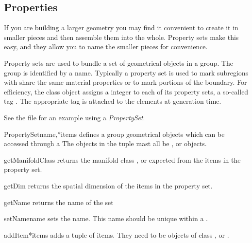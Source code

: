\subsection{Properties}

If you are building a larger geometry you may find it convenient to
create it in smaller pieces and then assemble them into the whole.
Property sets make this easy, and they allow you to name the smaller
pieces for convenience.

Property sets are used to bundle a set of geometrical objects in a
group.  The group is identified by a name.  Typically a property set
is used to mark subregions with share the same material properties or
to mark portions of the boundary.  For efficiency, the \Design class
object assigns a integer to each of its property sets, a so-called tag
.  The appropriate tag is attached to the elements at
generation time.

See the file  for an example using a {\it PropertySet}.


\begin{classdesc}{PropertySet}{name,*items}
defines a group geometrical objects which can be accessed through a 
The objects in the tuple  mast all be \ManifoldOneD, \ManifoldTwoD or \ManifoldThreeD objects.
\end{classdesc}


\begin{methoddesc}[PropertySet]{getManifoldClass}{}
returns the manifold class \ManifoldOneD, \ManifoldTwoD or \ManifoldThreeD expected from the items
in the property set.
\end{methoddesc}

\begin{methoddesc}[PropertySet]{getDim}{}
returns the spatial dimension of the items
in the property set.
\end{methoddesc}

\begin{methoddesc}[PropertySet]{getName}{}
returns the name of the set
\end{methoddesc}

\begin{methoddesc}[PropertySet]{setName}{name}
sets the name. This name should be unique within a \Design.
\end{methoddesc}

\begin{methoddesc}[PropertySet]{addItem}{*items}
adds a tuple of items. They need to be objects of class \ManifoldOneD, \ManifoldTwoD or \ManifoldThreeD.
\end{methoddesc}

